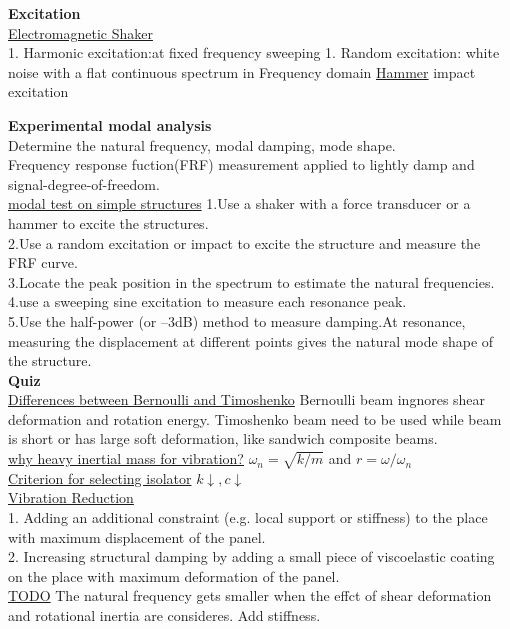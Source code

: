\documentclass{article}
\begin{document}
\begin{multicols*}{3}
\noindent\textbf{Excitation}\\
\underline{Electromagnetic Shaker}\\
  1. Harmonic excitation:at fixed frequency sweeping
  1. Random excitation: white noise with  a flat continuous spectrum in Frequency domain
\underline{Hammer} impact excitation

\noindent\textbf{Experimental modal analysis}\\
Determine the natural frequency, modal damping, mode shape.\\
Frequency response fuction(FRF) measurement applied to lightly damp and signal-degree-of-freedom.\\
\underline{modal test on simple structures}
1.Use a shaker with a force transducer or a hammer to excite the structures.\\
2.Use a random excitation or impact to excite the structure and measure the FRF curve.\\
3.Locate the peak position in the spectrum to estimate the natural frequencies.\\
4.use a sweeping sine excitation to measure each resonance peak.\\
5.Use the half-power (or –3dB) method to measure damping.At resonance, measuring the displacement at different points gives the natural mode shape of the structure.\\

  \noindent\textbf{Quiz}\\
  \underline{Differences between Bernoulli and Timoshenko} Bernoulli beam ingnores shear deformation and rotation energy. Timoshenko beam need to be used while beam is short or has large soft deformation, like sandwich composite beams.\\
  \underline{why heavy inertial mass for vibration?} $\omega_n=\sqrt{k/m}$ and $r=\omega/\omega_n$\\
  \underline{Criterion for selecting isolator} $k \downarrow, c \downarrow$ \\
  \underline{Vibration Reduction}\\
  1. Adding an additional constraint (e.g. local support or stiffness) to the place with maximum displacement of the panel.\\
  2. Increasing structural damping by adding a small piece of viscoelastic coating on the place with maximum deformation of the panel. \\
  \underline{TODO} The natural frequency gets smaller when the effct of shear deformation and rotational inertia are consideres. Add stiffness.\\



\end{multicols*}
\end{document}
